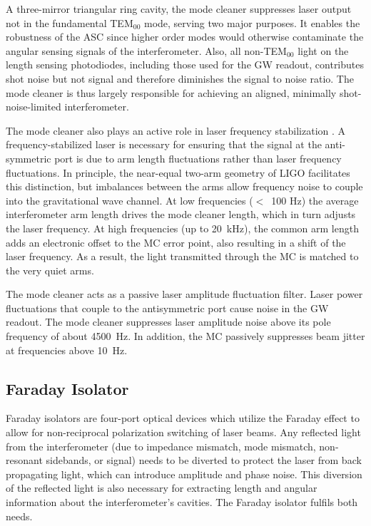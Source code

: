 A three-mirror triangular ring cavity, the mode cleaner suppresses
laser output not in the fundamental TEM$_{00}$ mode, serving two major
purposes. It enables the robustness of the ASC since higher order
modes would otherwise contaminate the angular sensing signals of the
interferometer. Also, all non-TEM$_{00}$ light on the length sensing
photodiodes, including those used for the GW readout, contributes shot
noise but not signal and therefore diminishes the signal to noise
ratio. The mode cleaner is thus largely responsible for achieving an
aligned, minimally shot-noise-limited interferometer.

The mode cleaner also plays an active role in laser frequency
stabilization \citep{Zucker2002H1}. A frequency-stabilized laser is
necessary for ensuring that the signal at the anti-symmetric port is
due to arm length fluctuations rather than laser frequency
fluctuations. In principle, the near-equal two-arm geometry of LIGO facilitates
this distinction, but imbalances between the arms allow frequency
noise to couple into the gravitational wave channel. At low
frequencies ($<$~100 Hz) the average interferometer arm length drives
the mode cleaner length, which in turn adjusts the laser frequency. At
high frequencies (up to 20~kHz), the common arm length adds an
electronic offset to the MC error point, also resulting in a shift of
the laser frequency. As a result, the light transmitted through the MC
is matched to the very quiet arms.
 
The mode cleaner acts as a passive laser amplitude fluctuation
filter. Laser power fluctuations that couple to the antisymmetric port
cause noise in the GW readout.  The mode cleaner suppresses laser
amplitude noise above its pole frequency of about 4500~Hz. In
addition, the MC passively suppresses beam jitter at frequencies above
10~Hz.


\subsection{Faraday Isolator}
Faraday isolators are four-port optical devices which utilize the
Faraday effect to allow for non-reciprocal polarization switching of
laser beams.  Any reflected light from the interferometer (due to
impedance mismatch, mode mismatch, non-resonant sidebands, or signal)
needs to be diverted to protect the laser from back propagating light,
which can introduce amplitude and phase noise.  This diversion of the
reflected light is also necessary for extracting length and angular
information about the interferometer's cavities. The Faraday isolator
fulfils both needs.


